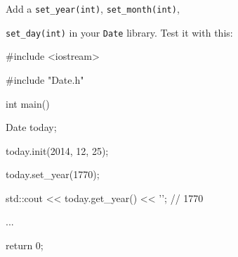 Add a \texttt{set\_year(int)}, \texttt{set\_month(int)},

\texttt{set\_day(int)} in your \texttt{Date} library. Test it with this:



\begin{consolethree}[escapeinside=||]

#include <iostream>

#include "Date.h"



int main()

{

    Date today;

    today.init(2014, 12, 25);

    today.set_year(1770);

    std::cout << today.get_year() << '\n'; // 1770

    ...

    return 0;

}

\end{consolethree}

